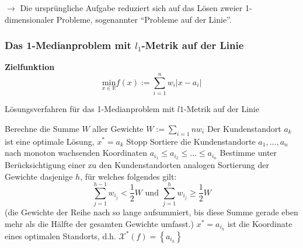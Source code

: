       $\rightarrow$ Die ursprüngliche Aufgabe reduziert sich auf das Lösen zweier 1-dimensionaler Probleme, sogenannter ``Probleme auf der Linie''.

      \subsubsection{Das 1-Medianproblem mit $l_1$-Metrik auf der Linie} %
      \label{ssub:das_1_medianproblem_mit_metrik_auf_der_linie}
      
      \par \textbf{Zielfunktion}
      \[\underset{x \in \mathbb{R}}{\text{min}} f(x) := \sum_{i= 1}^{n}w_i\left|x - a_i\right|\]

      \begin{algorithm}[H]
        \caption{Lösungsverfahren für das 1-Medianproblem mit $l1$-Metrik auf der Linie}
        \begin{algorithmic}[1]
          \State Berechne die Summe $W$ aller Gewichte $W:=\sum_{i= 1}{n}w_i$
            \State Der Kundenstandort $a_k$ ist eine optimale Lösung, $x^* = a_k$
            \State Stopp
          \Else
            \State Sortiere die Kundenstandorte $a_1, \dots, a_n$ nach monoton wachsenden Koordinaten $a_{i_1} \leq a_{i_2} \leq \dots \leq a_{i_n}$
            \State Bestimme unter Berücksichtigung einer zu den Kundenstandorten analogen Sortierung der Gewichte dasjenige $h$, für welches folgendes gilt:
            \[\sum_{j=1}^{h-1}w_{i_j} < \frac{1}{2}W \text{ und } \sum_{j=1}^{h}w_{i_j} \geq \frac{1}{2}W\] (die Gewichte der Reihe nach so lange aufsummiert, bis diese Summe gerade eben mehr als die Hälfte der gesamten Gewichte umfasst.)
            \State $x^* = a_{i_h}$ ist die Koordinate eines optimalen Standorts, d.h. $\mathcal{X}^*(f) = \left\{a_{i_h}\right\}$
          \EndIf
        \end{algorithmic}
      \end{algorithm}

      \begin{exmp}
        
      \end{exmp}

